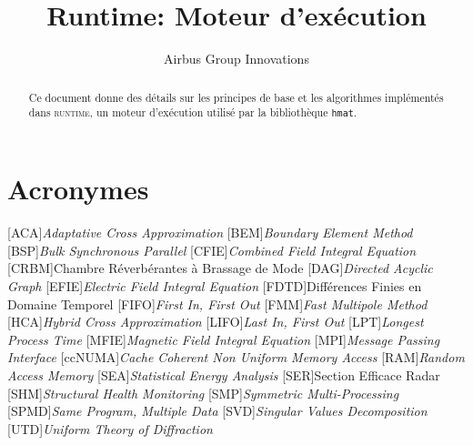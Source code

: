 \documentclass[11pt]{article}
\title{Runtime: Moteur d'exécution}
\author{Airbus Group Innovations}
\theoremstyle{plain} %
\theoremstyle{definition} %
\begin{document}
\maketitle

\newcommand{\mc}[1]{\mathcal{#1}}
\newcommand{\mcH}{$\mc{H}$}
\newcommand{\hmat}{$\mc{H}$-Matrice}
\newcommand{\hmats}{$\mc{H}$-Matrices}
\newcommand{\hvec}{$\mc{H}$-Vecteur}
\newcommand{\hvecs}{$\mc{H}$-Vecteurs}
\newcommand{\rkmat}{$\mc{R}k$-Matrice}
\newcommand{\rkmats}{$\mc{R}k$-Matrices}



\begin{abstract}
  Ce document donne des détails sur les principes de base et les algorithmes implémentés dans \textsc{runtime}, un moteur d'exécution utilisé par la bibliothèque \texttt{hmat}.
\end{abstract}

\tableofcontents

\section*{Acronymes}
\label{sec:acronymes}
\begin{acronym}[ccNUMA]
  [ACA]{\emph{Adaptative Cross Approximation}}
  [BEM]{\emph{Boundary Element Method}}
  [BSP]{\emph{Bulk Synchronous Parallel}}
  [CFIE]{\emph{Combined Field Integral Equation}}
  [CRBM]{Chambre Réverbérantes à Brassage de Mode}
  [DAG]{\emph{Directed Acyclic Graph}}
  [EFIE]{\emph{Electric Field Integral Equation}}
  [FDTD]{Différences Finies en Domaine Temporel}
  [FIFO]{\emph{First In, First Out}}
  [FMM]{\emph{Fast Multipole Method}}
  [HCA]{\emph{Hybrid Cross Approximation}}
  [LIFO]{\emph{Last In, First Out}}
  [LPT]{\emph{Longest Process Time}}
  [MFIE]{\emph{Magnetic Field Integral Equation}}
  [MPI]{\emph{Message Passing Interface}}
  [ccNUMA]{\emph{Cache Coherent Non Uniform Memory Access}}
  [RAM]{\emph{Random Access Memory}}
  [SEA]{\emph{Statistical Energy Analysis}}
  [SER]{Section Efficace Radar}
  [SHM]{\emph{Structural Health Monitoring}}
  [SMP]{\emph{Symmetric Multi-Processing}}
  [SPMD]{\emph{Same Program, Multiple Data}}
  [SVD]{\emph{Singular Values Decomposition}}
  [UTD]{\emph{Uniform Theory of Diffraction}}
\end{acronym}
\end{document}
